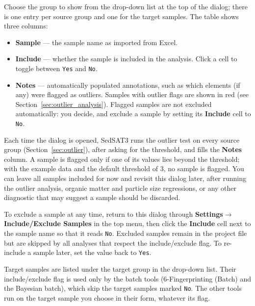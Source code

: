 \documentclass[12pt]{report}
\begin{document}
Choose the group to show from the drop-down list at the top of the dialog; there is one entry per source group and one for the target samples. The table shows three columns:

\begin{itemize}
    \item \textbf{Sample} --- the sample name as imported from Excel.
    \item \textbf{Include} --- whether the sample is included in the analysis. Click a cell to toggle between \texttt{Yes} and \texttt{No}.
    \item \textbf{Notes} --- automatically populated annotations, such as which elements (if any) were flagged as outliers. Samples with outlier flags are shown in red (see Section~\ref{sec:outlier_analysis}). Flagged samples are not excluded automatically: you decide, and exclude a sample by setting its \textbf{Include} cell to \texttt{No}.
\end{itemize}

Each time the dialog is opened, SedSAT3 runs the outlier test on every source group (Section~\ref{sec:outlier}), after asking for the threshold, and fills the \textbf{Notes} column. A sample is flagged only if one of its values lies beyond the threshold; with the example data and the default threshold of 3, no sample is flagged. You can leave all samples included for now and revisit this dialog later, after running the outlier analysis, organic matter and particle size regressions, or any other diagnostic that may suggest a sample should be discarded.

To exclude a sample at any time, return to this dialog through \textbf{Settings}$\rightarrow$\textbf{Include/Exclude Samples} in the top menu, then click the \textbf{Include} cell next to the sample name so that it reads \texttt{No}. Excluded samples remain in the project file but are skipped by all analyses that respect the include/exclude flag. To re-include a sample later, set the value back to \texttt{Yes}.

\begin{tcolorbox}[colback=yellow!10,colframe=yellow!50!black,title=Note]
Target samples are listed under the target group in the drop-down list. Their include/exclude flag is used only by the batch tools (6-Fingerprinting (Batch) and the Bayesian batch), which skip the target samples marked \texttt{No}. The other tools run on the target sample you choose in their form, whatever its flag.
\end{tcolorbox}
\end{document}
